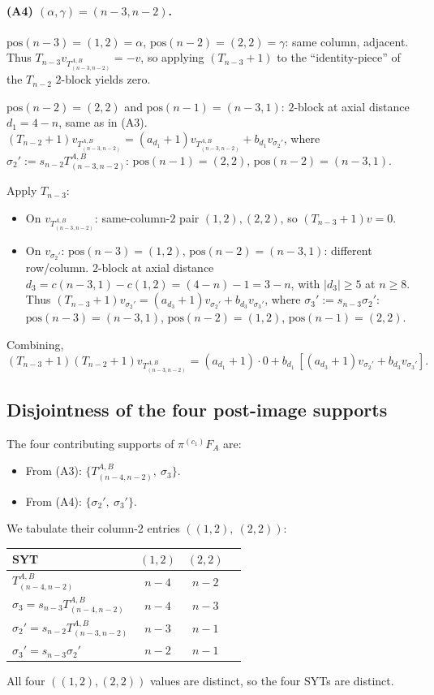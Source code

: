 \documentclass[11pt]{article}
\theoremstyle{definition}
\begin{document}
\paragraph{(A4) $(\alpha, \gamma) = (n{-}3, n{-}2)$.}
$\mathrm{pos}(n-3) = (1, 2) = \alpha$, $\mathrm{pos}(n-2) = (2, 2) = \gamma$:
same column, adjacent. Thus $T_{n-3} v_{T^{A,B}_{(n-3,n-2)}} =
-v$, so applying $(T_{n-3}{+}1)$ to the ``identity-piece'' of the
$T_{n-2}$ $2$-block yields zero.

$\mathrm{pos}(n-2) = (2, 2)$ and $\mathrm{pos}(n-1) = (n-3, 1)$:
$2$-block at axial distance $d_1 = 4-n$, same as in (A3).
$(T_{n-2}{+}1) v_{T^{A,B}_{(n-3,n-2)}} = (a_{d_1}{+}1) v_{T^{A,B}_{(n-3,n-2)}}
+ b_{d_1} v_{\sigma_2'}$, where
$\sigma_2' := s_{n-2} T^{A,B}_{(n-3,n-2)}$:
$\mathrm{pos}(n-1) = (2, 2)$, $\mathrm{pos}(n-2) = (n-3, 1)$.

Apply $T_{n-3}$:
\begin{itemize}[leftmargin=2em,topsep=0.3em,itemsep=0.2em]
\item On $v_{T^{A,B}_{(n-3,n-2)}}$: same-column-$2$ pair $(1,2),(2,2)$,
so $(T_{n-3}{+}1) v = 0$.
\item On $v_{\sigma_2'}$: $\mathrm{pos}(n-3) = (1, 2)$,
$\mathrm{pos}(n-2) = (n-3, 1)$: different row/column.
$2$-block at axial distance
$d_3 = c(n-3, 1) - c(1, 2) = (4-n) - 1 = 3-n$, with
$|d_3| \ge 5$ at $n \ge 8$. Thus
$(T_{n-3}{+}1) v_{\sigma_2'} = (a_{d_3}{+}1) v_{\sigma_2'} +
b_{d_3} v_{\sigma_3'}$, where
$\sigma_3' := s_{n-3} \sigma_2'$: $\mathrm{pos}(n-3) = (n-3, 1)$,
$\mathrm{pos}(n-2) = (1, 2)$, $\mathrm{pos}(n-1) = (2, 2)$.
\end{itemize}
Combining,
\[
   (T_{n-3}{+}1)(T_{n-2}{+}1) v_{T^{A,B}_{(n-3,n-2)}}
   = (a_{d_1}{+}1)\cdot 0
     + b_{d_1}\,[(a_{d_3}{+}1) v_{\sigma_2'} + b_{d_3} v_{\sigma_3'}].
\]

\subsection{Disjointness of the four post-image supports}

The four contributing supports of $\pi^{(c_1)} F_A$ are:
\begin{itemize}[leftmargin=2em,topsep=0.3em,itemsep=0.2em]
\item From (A3): $\{T^{A,B}_{(n-4,n-2)},\ \sigma_3\}$.
\item From (A4): $\{\sigma_2',\ \sigma_3'\}$.
\end{itemize}
We tabulate their column-$2$ entries $((1,2),\ (2,2))$:
\begin{center}
\begin{tabular}{lccc}
\toprule
SYT & $(1, 2)$ & $(2, 2)$ \\
\midrule
$T^{A,B}_{(n-4,n-2)}$ & $n-4$ & $n-2$ \\
$\sigma_3 = s_{n-3} T^{A,B}_{(n-4,n-2)}$ & $n-4$ & $n-3$ \\
$\sigma_2' = s_{n-2} T^{A,B}_{(n-3,n-2)}$ & $n-3$ & $n-1$ \\
$\sigma_3' = s_{n-3} \sigma_2'$ & $n-2$ & $n-1$ \\
\bottomrule
\end{tabular}
\end{center}
All four $((1,2), (2,2))$ values are distinct, so the four SYTs
are distinct.
\end{document}
